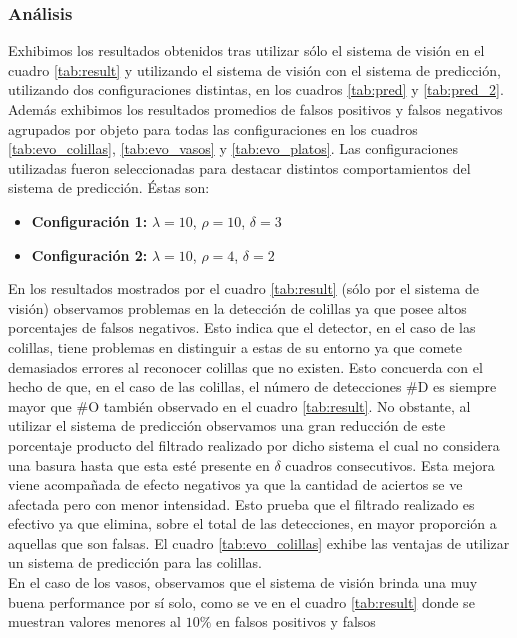 \subsubsection{An\'alisis}
Exhibimos los resultados obtenidos tras utilizar s\'olo el sistema de 
visi\'on en el cuadro \ref{tab:result} y utilizando el sistema de 
visi\'on con el sistema de predicci\'on, utilizando dos configuraciones 
distintas, en 
los cuadros \ref{tab:pred} y  \ref{tab:pred_2}. Adem\'as exhibimos los 
resultados promedios de falsos positivos y falsos negativos agrupados 
por objeto para todas las configuraciones en los cuadros \ref{tab:evo_colillas}, 
\ref{tab:evo_vasos} y \ref{tab:evo_platos}. Las configuraciones 
utilizadas fueron seleccionadas para destacar distintos comportamientos del 
sistema de predicci\'on. \'Estas son:
\begin{itemize}
\item{\textbf{Configuraci\'on 1:} $\lambda=10$, $\rho=10$, $\delta=3$}
	\item{\textbf{Configuraci\'on 2:} $\lambda=10$, $\rho=4$, $\delta=2$}
\end{itemize}
\indent En los resultados mostrados por el cuadro \ref{tab:result} 
(s\'olo por el sistema de visi\'on) observamos problemas en la  detecci\'on de colillas ya que posee altos 
porcentajes de falsos negativos. Esto indica que el detector, en el 
caso de las colillas, tiene
problemas en distinguir a estas de su entorno ya que comete 
demasiados errores al reconocer colillas que no existen. Esto concuerda 
con el hecho de que, en el caso de las colillas, el n\'umero de 
detecciones \#D es siempre mayor que \#O tambi\'en observado en el 
cuadro \ref{tab:result}. No obstante, al utilizar el sistema de 
predicci\'on observamos una gran reducci\'on de este porcentaje producto 
del filtrado realizado por dicho sistema el cual no considera una 
basura hasta que esta est\'e presente en $\delta$ cuadros consecutivos.  
Esta mejora viene acompa\~nada de efecto negativos ya que la cantidad de 
aciertos se ve afectada pero con menor intensidad. Esto prueba que el 
filtrado realizado es efectivo ya que elimina, sobre el total de las 
detecciones, en mayor proporci\'on a 
aquellas que son falsas. El cuadro \ref{tab:evo_colillas} exhibe las ventajas de utilizar un sistema de 
predicci\'on para las colillas.\\
\indent 
En el caso de los vasos, observamos que el sistema de visi\'on brinda 
una muy buena performance por s\'i solo, como se ve en el cuadro \ref{tab:result} 
donde se muestran valores menores al $10\%$ en falsos positivos y falsos 
